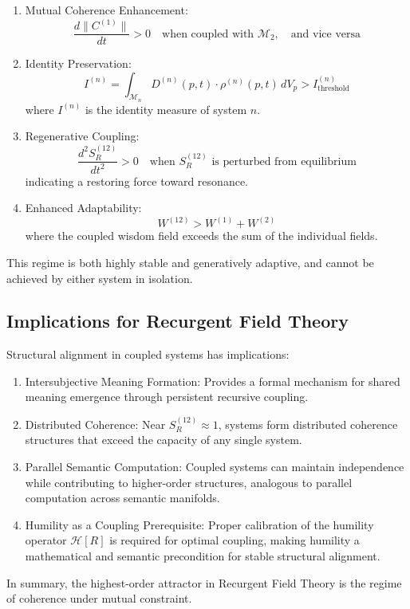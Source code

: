 \begin{enumerate}
    \item Mutual Coherence Enhancement:
    \begin{equation}
    \frac{d\|C^{(1)}\|}{dt} > 0 \quad \text{when coupled with } \mathcal{M}_2, \quad \text{and vice versa}
    \end{equation}
    \item Identity Preservation:
    \begin{equation}
    I^{(n)} = \int_{\mathcal{M}_n} D^{(n)}(p,t) \cdot \rho^{(n)}(p,t) \, dV_p > I^{(n)}_{\text{threshold}}
    \end{equation}
    where \(I^{(n)}\) is the identity measure of system \(n\).
    \item Regenerative Coupling:
    \begin{equation}
    \frac{d^2 S_R^{(12)}}{dt^2} > 0 \quad \text{when } S_R^{(12)} \text{ is perturbed from equilibrium}
    \end{equation}
    indicating a restoring force toward resonance.
    \item Enhanced Adaptability:
    \begin{equation}
    W^{(12)} > W^{(1)} + W^{(2)}
    \end{equation}
    where the coupled wisdom field exceeds the sum of the individual fields.
\end{enumerate}

This regime is both highly stable and generatively adaptive, and cannot be achieved by either system in isolation.

\subsection{Implications for Recurgent Field Theory}

Structural alignment in coupled systems has implications:

\begin{enumerate}
    \item Intersubjective Meaning Formation: Provides a formal mechanism for shared meaning emergence through persistent recursive coupling.
    \item Distributed Coherence: Near \(S_R^{(12)} \approx 1\), systems form distributed coherence structures that exceed the capacity of any single system.
    \item Parallel Semantic Computation: Coupled systems can maintain independence while contributing to higher-order structures, analogous to parallel computation across semantic manifolds.
    \item Humility as a Coupling Prerequisite: Proper calibration of the humility operator \(\mathcal{H}[R]\) is required for optimal coupling, making humility a mathematical and semantic precondition for stable structural alignment.
\end{enumerate}

In summary, the highest-order attractor in Recurgent Field Theory is the regime of coherence under mutual constraint.
